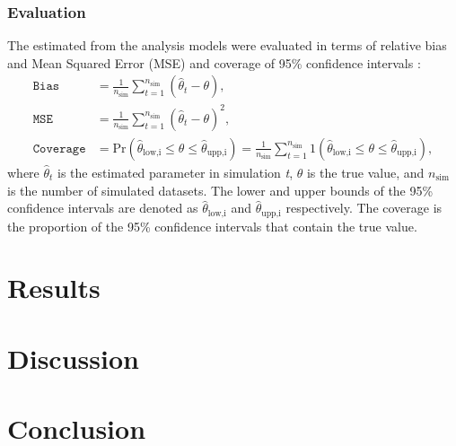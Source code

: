 \documentclass[10pt, a4paper, titlepage]{article}
\begin{document}
\subsubsection{Evaluation}
The estimated from the analysis models were evaluated in terms of relative bias and Mean Squared Error (MSE) and coverage of 95\% confidence intervals \citep{morris2019}:
\begin{subequations}
\begin{align}
\label{eq:evaluations}
    \texttt{Bias} &= \frac{1}{n_{\text{sim}}} \sum_{t=1}^{n_{\text{sim}}} (\hat{\theta}_t - \theta), \\
    \texttt{MSE} &= \frac{1}{n_{\text{sim}}} \sum_{t=1}^{n_{\text{sim}}} (\hat{\theta}_t - \theta)^{2}, {} \\
    \texttt{Coverage} &= \text{Pr}(\hat{\theta}_{\text{low,i}} \leq \theta \leq \hat{\theta}_{\text{upp,i}}) = \frac{1}{n_{\text{sim}}} \sum_{t=1}^{n_{\text{sim}}} 1(\hat{\theta}_{\text{low,i}} \leq \theta \leq \hat{\theta}_{\text{upp,i}}),
\end{align}
\end{subequations} where $\hat{\theta}_t$ is the estimated parameter in simulation \textit{t}, $\theta$ is the true value, and $n_{\text{sim}}$ is the number of simulated datasets. The lower and upper bounds of the 95\% confidence intervals are denoted as $\hat{\theta}_{\text{low,i}}$ and $\hat{\theta}_{\text{upp,i}}$ respectively. The coverage is the proportion of the 95\% confidence intervals that contain the true value. 

\section{Results}

\section{Discussion}

\section{Conclusion}

\newpage
\end{document}

